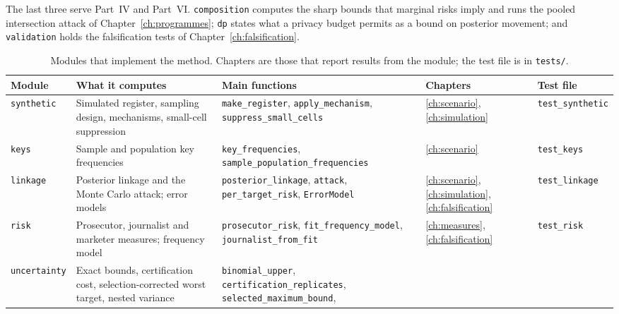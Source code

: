 The last three serve Part~IV and Part~VI. \texttt{composition} computes the sharp
bounds that marginal risks imply and runs the pooled intersection attack of
Chapter~\ref{ch:programmes}; \texttt{dp} states what a privacy budget permits as a
bound on posterior movement; and \texttt{validation} holds the falsification tests of
Chapter~\ref{ch:falsification}.

\begin{table}[ht]
\centering
\caption{Modules that implement the method. Chapters are those that report results
from the module; the test file is in \texttt{tests/\allowbreak{}}.}
\label{app:tab-core}
\footnotesize
\setlength{\tabcolsep}{3pt}
\begin{tabular}{@{}>{\raggedright\arraybackslash}p{2.0cm}>{\raggedright\arraybackslash}p{3.6cm}>{\raggedright\arraybackslash}p{4.1cm}>{\raggedright\arraybackslash}p{1.8cm}>{\raggedright\arraybackslash}p{2.8cm}@{}}
\toprule
Module & What it computes & Main functions & Chapters & Test file \\
\midrule
\texttt{synthetic} & Simulated register, sampling design, mechanisms, small-cell
suppression & \texttt{make\_\allowbreak{}register}, \texttt{apply\_\allowbreak{}mechanism},
\texttt{suppress\_\allowbreak{}small\_\allowbreak{}cells} & \ref{ch:scenario}, \ref{ch:simulation} &
\texttt{test\_\allowbreak{}synthetic} \\
\texttt{keys} & Sample and population key frequencies & \texttt{key\_\allowbreak{}frequencies},
\texttt{sample\_\allowbreak{}population\_\allowbreak{}frequencies} & \ref{ch:scenario} &
\texttt{test\_\allowbreak{}keys} \\
\texttt{linkage} & Posterior linkage and the Monte Carlo attack; error models &
\texttt{posterior\_\allowbreak{}linkage}, \texttt{attack}, \texttt{per\_\allowbreak{}target\_\allowbreak{}risk},
\texttt{ErrorModel} & \ref{ch:scenario}, \ref{ch:simulation}, \ref{ch:falsification}
& \texttt{test\_\allowbreak{}linkage} \\
\texttt{risk} & Prosecutor, journalist and marketer measures; frequency model &
\texttt{prosecutor\_\allowbreak{}risk}, \texttt{fit\_\allowbreak{}frequency\_\allowbreak{}model},
\texttt{journalist\_\allowbreak{}from\_\allowbreak{}fit} & \ref{ch:measures}, \ref{ch:falsification} &
\texttt{test\_\allowbreak{}risk} \\
\texttt{uncertainty} & Exact bounds, certification cost, selection-corrected worst
target, nested variance & \texttt{binomial\_\allowbreak{}upper},
\texttt{certification\_\allowbreak{}replicates}, \texttt{selected\_\allowbreak{}maximum\_\allowbreak{}bound},

\end{tabular}
\end{table}
